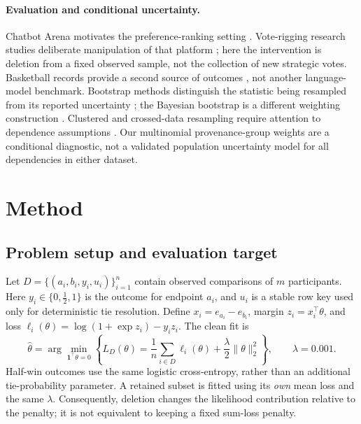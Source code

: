 \documentclass{article}
\begin{document}
\paragraph{Evaluation and conditional uncertainty.}
Chatbot Arena motivates the preference-ranking setting \citep{Chiang2024}. Vote-rigging research studies deliberate manipulation of that platform \citep{Min2025}; here the intervention is deletion from a fixed observed sample, not the collection of new strategic votes. Basketball records provide a second source of outcomes \citep{NBAdata}, not another language-model benchmark. Bootstrap methods distinguish the statistic being resampled from its reported uncertainty \citep{Efron1979,Davison1997}; the Bayesian bootstrap is a different weighting construction \citep{Rubin1981}. Clustered and crossed-data resampling require attention to dependence assumptions \citep{Field2007,Owen2007}. Our multinomial provenance-group weights are a conditional diagnostic, not a validated population uncertainty model for all dependencies in either dataset.

\section{Method}
\subsection{Problem setup and evaluation target}
Let $D=\{(a_i,b_i,y_i,u_i)\}_{i=1}^{n}$ contain observed comparisons of $m$ participants. Here $y_i\in\{0,\tfrac12,1\}$ is the outcome for endpoint $a_i$, and $u_i$ is a stable row key used only for deterministic tie resolution. Define $x_i=e_{a_i}-e_{b_i}$, margin $z_i=x_i^\top\theta$, and loss $\ell_i(\theta)=\log(1+\exp z_i)-y_i z_i$. The clean fit is
\begin{equation}
 \widehat\theta=\arg\min_{\mathbf{1}^\top\theta=0}
 \left\{L_D(\theta)=\frac{1}{n}\sum_{i\in D}\ell_i(\theta)
             +\frac{\lambda}{2}\|\theta\|_2^2\right\},\qquad \lambda=0.001.
 \label{eq:objective}
\end{equation}
Half-win outcomes use the same logistic cross-entropy, rather than an additional tie-probability parameter. A retained subset is fitted using its \emph{own} mean loss and the same $\lambda$. Consequently, deletion changes the likelihood contribution relative to the penalty; it is not equivalent to keeping a fixed sum-loss penalty.
\end{document}
